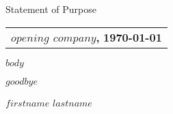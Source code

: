 \documentclass[$size$]{article}
\begin{document}
\begin{center}
    {Statement of Purpose}
\end{center}

%

\bigskip

\noindent
\begin{tabular}{@{}p{\textwidth}}
\textbf{$opening$ $company$,} \hfill \textbf{\today}
\end{tabular}

\bigskip

$body$

\noindent
$goodbye$

$firstname$ $lastname$

\bigskip

\noindent
\end{document}
